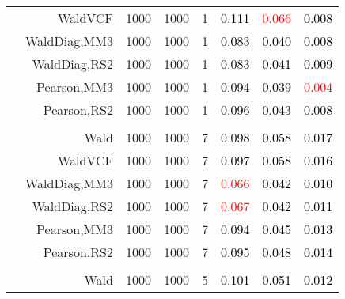 \documentclass[
]{article}
\begin{document}
\begin{table}[H]
{\begin{tabular}[t]{lrrrrrrr}
\hspace{1em} & WaldVCF & 1000 & 1000 & 1 & \textcolor{black}{0.111} & \textcolor{red}{0.066} & \textcolor{black}{0.008}\\

\hspace{1em} & WaldDiag,MM3 & 1000 & 1000 & 1 & \textcolor{black}{0.083} & \textcolor{black}{0.040} & \textcolor{black}{0.008}\\

\hspace{1em} & WaldDiag,RS2 & 1000 & 1000 & 1 & \textcolor{black}{0.083} & \textcolor{black}{0.041} & \textcolor{black}{0.009}\\

\hspace{1em} & Pearson,MM3 & 1000 & 1000 & 1 & \textcolor{black}{0.094} & \textcolor{black}{0.039} & \textcolor{red}{0.004}\\

\hspace{1em} & Pearson,RS2 & 1000 & 1000 & 1 & \textcolor{black}{0.096} & \textcolor{black}{0.043} & \textcolor{black}{0.008}\\
\cmidrule{1-8}
\addlinespace[0.3em]
\multicolumn{8}{l}{\textbf{1F 15V}}\\
\hspace{1em} & Wald & 1000 & 1000 & 7 & \textcolor{black}{0.098} & \textcolor{black}{0.058} & \textcolor{black}{0.017}\\

\hspace{1em} & WaldVCF & 1000 & 1000 & 7 & \textcolor{black}{0.097} & \textcolor{black}{0.058} & \textcolor{black}{0.016}\\

\hspace{1em} & WaldDiag,MM3 & 1000 & 1000 & 7 & \textcolor{red}{0.066} & \textcolor{black}{0.042} & \textcolor{black}{0.010}\\

\hspace{1em} & WaldDiag,RS2 & 1000 & 1000 & 7 & \textcolor{red}{0.067} & \textcolor{black}{0.042} & \textcolor{black}{0.011}\\

\hspace{1em} & Pearson,MM3 & 1000 & 1000 & 7 & \textcolor{black}{0.094} & \textcolor{black}{0.045} & \textcolor{black}{0.013}\\

\hspace{1em} & Pearson,RS2 & 1000 & 1000 & 7 & \textcolor{black}{0.095} & \textcolor{black}{0.048} & \textcolor{black}{0.014}\\
\cmidrule{1-8}
\addlinespace[0.3em]
\multicolumn{8}{l}{\textbf{2F 10V}}\\
\hspace{1em} & Wald & 1000 & 1000 & 5 & \textcolor{black}{0.101} & \textcolor{black}{0.051} & \textcolor{black}{0.012}\\


\end{tabular}}
\end{table}
\end{document}
